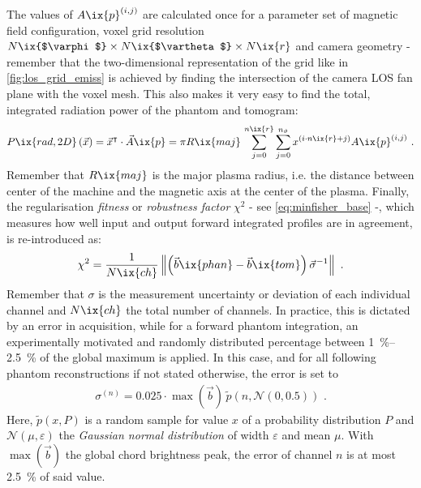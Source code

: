 %
        The values of $A\ix{p}^{\left(i,j\right)}$ are calculated once for a parameter set of magnetic field configuration, voxel grid resolution $N\ix{$\varphi$}\times N\ix{$\vartheta$}\times N\ix{r}$ and camera geometry - remember that the two-dimensional representation of the grid like in \cref{fig:los_grid_emiss} is achieved by finding the intersection of the camera LOS fan plane with the voxel mesh. This also makes it very easy to find the total, integrated radiation power of the phantom and tomogram:
%
        \begin{align}%
            P\ix{rad,2D}\left(\vec{x}\right)=\vec{x}^{\intercal}\cdot\vec{A}\ix{p}=%
            \pi R\ix{maj}\,\displaystyle\sum_{j=0}^{n\ix{r}}\sum_{j=0}^{n_{\vartheta}}x^{\left(i\cdot n\ix{r}+j\right)}A\ix{p}^{\left(i,j\right)}\,\,.%
            \label{eq:prad2D}%
        \end{align}%
%
        Remember that $R\ix{maj}$ is the major plasma radius, i.e. the distance between center of the machine and the magnetic axis at the center of the plasma. Finally, the regularisation \textit{fitness} or \textit{robustness factor} $\chi^{2}$ - see \cref{eq:minfisher_base} -, which measures how well input and output forward integrated profiles are in agreement, is re-introduced as:%
%
        \begin{align}%
            \chi^{2}=\frac{1}{N\ix{ch}}\left\|\left(\vec{b}\ix{phan}-\vec{b}\ix{tom}\right)\vec{\sigma}^{-1}\right\|\,\,.\label{eq:chi2}%
        \end{align}%
%
        Remember that $\sigma$ is the measurement uncertainty or deviation of each individual channel and $N\ix{ch}$ the total number of channels. In practice, this is dictated by an error in acquisition, while for a forward phantom integration, an experimentally motivated and randomly distributed percentage between \SIrange{1}{2.5}{\percent} of the global maximum is applied. In this case, and for all following phantom reconstructions if not stated otherwise, the error is set to%
%
        \begin{align}%
            \sigma^{\left(n\right)}=0.025\cdot\max\left(\vec{b}\right)\,\widetilde{p}\left(n,\mathcal{N}\left(0,0.5\right)\right)\,\,.\nonumber%
        \end{align}%
%
        Here, $\widetilde{p}\left(x,P\right)$ is a random sample for value $x$ of a probability distribution $P$ and $\mathcal{N}\left(\mu,\varepsilon\right)$ the \textit{Gaussian normal distribution} of width $\varepsilon$ and mean $\mu$. With $\max\left(\vec{b}\right)$ the global chord brightness peak, the error of channel $n$ is at most \SI{2.5}{\percent} of said value.\\%
